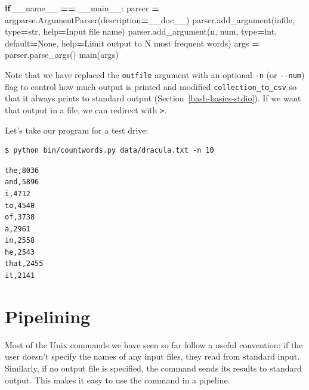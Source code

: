 \documentclass[
]{krantz}
\makeatletter
\newenvironment{Shaded}{\begin{snugshade}}{\end{snugshade}}
\newcommand{\BuiltInTok}[1]{#1}
\newcommand{\ControlFlowTok}[1]{\textcolor[rgb]{0.13,0.29,0.53}{\textbf{#1}}}
\newcommand{\NormalTok}[1]{#1}
\newcommand{\OperatorTok}[1]{\textcolor[rgb]{0.81,0.36,0.00}{\textbf{#1}}}
\newcommand{\StringTok}[1]{\textcolor[rgb]{0.31,0.60,0.02}{#1}}
\newcommand{\VariableTok}[1]{\textcolor[rgb]{0.00,0.00,0.00}{#1}}
\newenvironment{kframe}{%
\medskip{}
\setlength{\fboxsep}{.8em}
 \def\at@end@of@kframe{}%
 \ifinner\ifhmode%
  \def\at@end@of@kframe{\end{minipage}}%
  \begin{minipage}{\columnwidth}%
 \fi\fi%
 \def\FrameCommand##1{\hskip\@totalleftmargin \hskip-\fboxsep
 \colorbox{shadecolor}{##1}\hskip-\fboxsep
     \hskip-\linewidth \hskip-\@totalleftmargin \hskip\columnwidth}%
 \MakeFramed {\advance\hsize-\width
   \@totalleftmargin\z@ \linewidth\hsize
   \@setminipage}}%
 {\par\unskip\endMakeFramed%
 \at@end@of@kframe}
\renewenvironment{Shaded}{\begin{kframe}}{\end{kframe}}
\makeatother
\begin{document}
\begin{Shaded}
\begin{Highlighting}[]
\ControlFlowTok{if} \VariableTok{\_\_name\_\_} \OperatorTok{==} \StringTok{\textquotesingle{}\_\_main\_\_\textquotesingle{}}\NormalTok{:}
\NormalTok{    parser }\OperatorTok{=}\NormalTok{ argparse.ArgumentParser(description}\OperatorTok{=}\NormalTok{\_\_doc\_\_)}
\NormalTok{    parser.add\_argument(}\StringTok{\textquotesingle{}infile\textquotesingle{}}\NormalTok{, }\BuiltInTok{type}\OperatorTok{=}\BuiltInTok{str}\NormalTok{, }\BuiltInTok{help}\OperatorTok{=}\StringTok{\textquotesingle{}Input file name\textquotesingle{}}\NormalTok{)}
\NormalTok{    parser.add\_argument(}\StringTok{\textquotesingle{}{-}n\textquotesingle{}}\NormalTok{, }\StringTok{\textquotesingle{}{-}{-}num\textquotesingle{}}\NormalTok{, }\BuiltInTok{type}\OperatorTok{=}\BuiltInTok{int}\NormalTok{, default}\OperatorTok{=}\VariableTok{None}\NormalTok{,}
                        \BuiltInTok{help}\OperatorTok{=}\StringTok{\textquotesingle{}Limit output to N most frequent words\textquotesingle{}}\NormalTok{)}
\NormalTok{    args }\OperatorTok{=}\NormalTok{ parser.parse\_args()}
\NormalTok{    main(args)}
\end{Highlighting}
\end{Shaded}

Note that we have replaced the \texttt{\textquotesingle{}outfile\textquotesingle{}} argument with an optional \texttt{-n} (or \texttt{-\/-num}) flag
to control how much output is printed
and modified \texttt{collection\_to\_csv} so that it always prints to standard output
(Section~\ref{bash-basics-stdio}).
If we want that output in a file,
we can redirect with \texttt{\textgreater{}}.

Let's take our program for a test drive:

\begin{verbatim}
$ python bin/countwords.py data/dracula.txt -n 10
\end{verbatim}

\begin{verbatim}
the,8036
and,5896
i,4712
to,4540
of,3738
a,2961
in,2558
he,2543
that,2455
it,2141
\end{verbatim}

\hypertarget{scripting-pipeline}{%
\section{Pipelining}\label{scripting-pipeline}}

Most of the Unix commands we have seen so far follow a useful convention:
if the user doesn't specify the names of any input files,
they read from standard input.
Similarly,
if no output file is specified,
the command sends its results to standard output.
This makes it easy to use the command in a pipeline.
\end{document}
